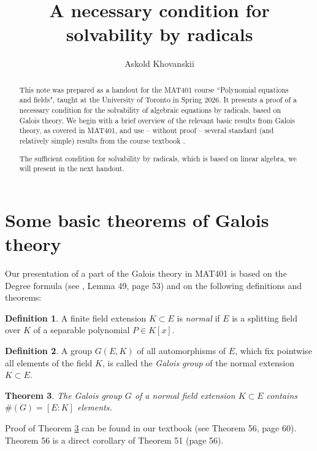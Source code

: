 \documentclass[11pt]{article}
\theoremstyle{plain}
\newtheorem{theorem}{Theorem}[section]
\theoremstyle{definition}
\newtheorem{definition}[theorem]{Definition}
\begin{document}
\title{\bf {A  necessary condition for solvability by radicals}}

\author{Askold Khovanskii}

\maketitle
\begin{abstract}
This note was prepared as a handout for the MAT401 course ``Polynomial equations  and fields", taught at the University of Toronto  in Spring 2026.  It presents a proof of a necessary condition for the solvability of algebraic equations by radicals, based on Galois theory.
We begin with a brief overview of the relevant basic results from Galois theory, as covered in MAT401, and use -- without proof -- several standard (and relatively simple) results from the course textbook \cite{Rotman}.

The sufficient condition for solvability by radicals, which is based on  linear algebra, we will present in the next handout.
\end{abstract}

\section{Some basic theorems of Galois theory}

Our  presentation of a part of the Galois theory in MAT401 is based on the Degree  formula (see \cite{Rotman}, Lemma 49, page 53) and on  the following definitions and theorems:

\begin{definition} A finite field extension $K\subset E$ is {\it normal} if $E$ is a splitting field over $K$ of a separable polynomial $P\in K[x]$.
\end{definition}

\begin{definition} A group $G(E,K)$ of all automorphisms of $E$, which fix pointwise all elements of the field $K$, is called the {\it Galois group} of the normal extension $K\subset E$.
\end{definition}

\begin{theorem}\label{groupdegre} The Galois group $G$ of a normal field extension $K\subset E$  contains  $\# (G)=[E:K]$ elements.
\end{theorem}

Proof of Theorem \ref{groupdegre} can be found in our textbook \cite{Rotman} (see Theorem 56,   page 60). Theorem 56 is a direct corollary of Theorem 51 (page 56).
\end{document}
